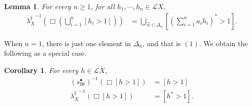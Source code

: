 \documentclass[preprint,12pt]{elsarticle}
\newcommand{\Rp}{\mathbb{R}_+}
\newcommand\diff{\smallsetminus}
\newcommand\Lform{\mathcal L}
\newcommand\Demon{{\mathtt{D}}}
\newcommand\Nature{{\mathtt{P}}}
\newcommand\DN{{\Demon\Nature}}
\newcommand\Smyth{{\mathcal Q}}
\newcommand\Vt{\mathsf{V}}
\newcommand\SV{\Smyth_{\Vt}}
\newcommand\Val{{\mathbf V}}
\newtheorem{corollary}[theorem]{Corollary}
\newtheorem{lemma}[theorem]{Lemma}
\begin{document}
\begin{lemma}
  \label{lemma:lambda:inv:func}
  For every $n \geq 1$, for all $h_1, \cdots, h_n \in \Lform X$,
  \begin{align*}
    {\lambda^\sharp_X}^{-1} (\Box {(\bigcup_{i=1}^n [h_i > 1])})
    & = \bigcup_{\vec a \in \Delta_n} \left[(\sum_{i=1}^n a_i h_i)^* >
      1\right].
  \end{align*}
\end{lemma}

When $n=1$, there is just one element in $\Delta_n$, and that is
$(1)$.  We obtain the following as a special case.
\begin{corollary}
  \label{corl:lambda:inv:func:spec}
  For every $h \in \Lform X$,
  \begin{align*}
    {(s_\DN^\bullet)}^{-1} (\Box {[h > 1]}) & = [h > 1] \\
    {\lambda^\sharp_X}^{-1} (\Box {[h > 1]}) & = [h^* > 1].
  \end{align*}
\end{corollary}

\end{document}
